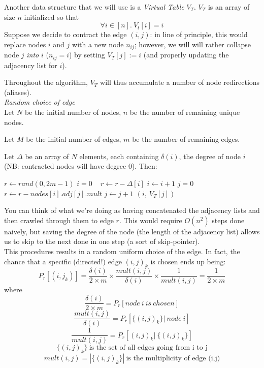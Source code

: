 \documentclass[a4paper]{article}
\begin{document}
Another data structure that we will use is a \textit{Virtual Table} $V_T$. $V_T$ is an array of size $n$ initialized so that 
$$ \forall i \in [n].\ V_t[i]=i$$
Suppose we decide to contract the edge $(i,j)$: in line of principle, this would replace nodes $i$ and $j$ with a new node $n_{ij}$; however, we will will rather collapse node $j$ \emph{into} $i$ ($n_{ij} = i$) by setting $V_T[j] := i$ (and properly updating the adjacency list for $i$).

Throughout the algorithm, $V_T$ will thus accumulate a number of node redirections (aliases).
\\

\noindent
\textit{Random choice of edge}\\
Let $N$ be the initial number of nodes, $n$ be the number of remaining unique nodes.

Let $M$ be the initial number of edges, $m$ be the number of remaining edges.

Let $\Delta$ be an array of $N$ elements, each containing $\delta(i)$, the degree of node $i$ (NB: contracted nodes will have degree 0). Then:\\


\begin{algorithmic}
\State $r \gets rand(0, 2m-1)$ 
\State $i = 0$ \
	\State $r \gets r - \Delta[i]$
	\State $i \gets i + 1$
\EndWhile
\State $j = 0$
	\State $r \gets r - nodes[i].adj[j].mult$
	\State $j \gets j + 1$
\EndWhile
\State \Return $(i,\ V_T[j])$
\State
\EndFunction
\end{algorithmic}

You can think of what we're doing as having concatenated the adjacency lists and then crawled through them to edge $r$. This would require $O(n^2)$ steps done naively, but saving the degree of the node (the length of the adjacency list) allows us to skip to the next done in one step (a sort of skip-pointer).
\\

This procedures results in a random uniform choice of the edge. In fact, the chance that a specific (directed!) edge $(i, j)_k$ is chosen ends up being:
$$P_r[(i,j_k)] = \frac{\delta(i)}{2 \times m} \times \frac{mult(i,j)}{\delta(i)} \times \frac{1}{mult(i,j)} = \frac{1}{2 \times m}$$
where
$$\frac{\delta(i)}{2 \times m} = P_r[node\ i\ is\ chosen]$$
$$\frac{mult(i,j)}{\delta(i)} = P_r[\{(i,j)_k\}|\ node\ i]$$
$$\frac{1}{mult(i,j)} = P_r[(i,j)_k|\ \{(i,j)_k\}]$$
$$\{(i,j)_k\}\ \text{is the set of all edges going from i to j}$$
$$mult(i,j) = |\{(i,j)_k\}|\ \text{is the multiplicity of edge (i,j)}$$
\\
\end{document}
